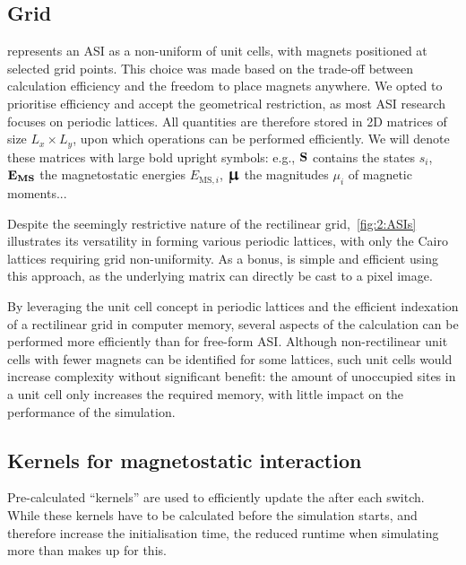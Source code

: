 \subsection{Grid}\label{sec:2:Implementation:Grid}
\hotspice{} represents an ASI as a non-uniform  of unit cells, with magnets positioned at selected grid points.
This choice was made based on the trade-off between calculation efficiency and the freedom to place magnets anywhere.
We opted to prioritise efficiency and accept the geometrical restriction, as most ASI research focuses on periodic lattices.
All quantities are therefore stored in 2D matrices of size $L_x \times L_y$, upon which operations can be performed efficiently.
We will denote these matrices with large bold upright symbols: e.g., $\boldsymbol{\mathbf{S}}$ contains the states $s_i$, $\boldsymbol{\mathbf{E_\mathrm{MS}}}$ the magnetostatic energies $E_{\mathrm{MS},i}$, $\vc{\bigmu}$ the magnitudes $\mu_i$ of magnetic moments... \par %
Despite the seemingly restrictive nature of the rectilinear grid,~\cref{fig:2:ASIs} illustrates its versatility in forming various periodic lattices, with only the Cairo lattices requiring grid non-uniformity.
As a bonus,  is simple and efficient using this approach, as the underlying matrix can directly be cast to a pixel image. \\\par
By leveraging the unit cell concept in periodic lattices and the efficient indexation of a rectilinear grid in computer memory, several aspects of the calculation can be performed more efficiently than for free-form ASI.
Although non-rectilinear unit cells with fewer magnets can be identified for some lattices, such unit cells would increase complexity without significant benefit: the amount of unoccupied sites in a unit cell only increases the required memory, with little impact on the performance of the simulation.

\subsection{Kernels for magnetostatic interaction}\label{sec:2:Kernels}
Pre-calculated ``kernels'' are used to efficiently update the  after each switch. 
While these kernels have to be calculated before the simulation starts, and therefore increase the initialisation time, the reduced runtime when simulating  more than makes up for this.

